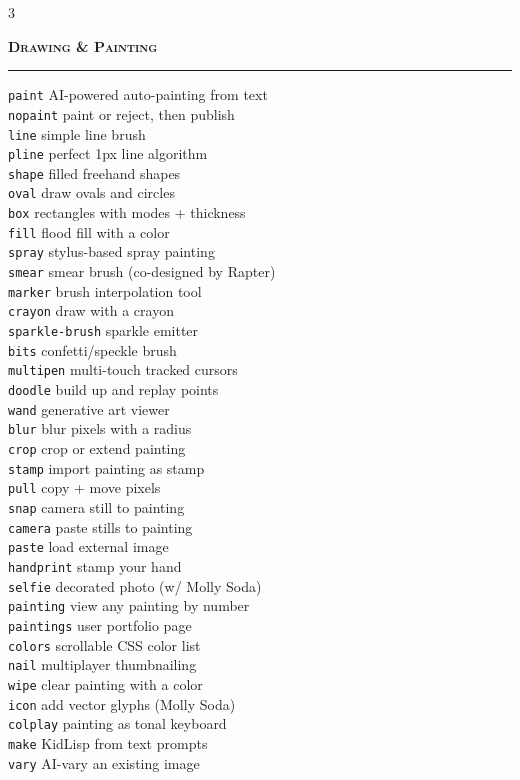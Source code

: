 \documentclass[10pt,letterpaper,twocolumn]{article}
\newcommand{\pe}[2]{\texttt{\color{acpurple}#1} #2}
\newcommand{\peh}[1]{\vspace{0.3em}\noindent\textbf{\textsc{#1}}\par\vspace{0.1em}\hrule\vspace{0.2em}}
\begin{document}
\vspace{0.3em}

\begin{multicols}{3}
\scriptsize

\peh{Drawing \& Painting}
\pe{paint}{AI-powered auto-painting from text}\\
\pe{nopaint}{paint or reject, then publish}\\
\pe{line}{simple line brush}\\
\pe{pline}{perfect 1px line algorithm}\\
\pe{shape}{filled freehand shapes}\\
\pe{oval}{draw ovals and circles}\\
\pe{box}{rectangles with modes + thickness}\\
\pe{fill}{flood fill with a color}\\
\pe{spray}{stylus-based spray painting}\\
\pe{smear}{smear brush (co-designed by Rapter)}\\
\pe{marker}{brush interpolation tool}\\
\pe{crayon}{draw with a crayon}\\
\pe{sparkle-brush}{sparkle emitter}\\
\pe{bits}{confetti/speckle brush}\\
\pe{multipen}{multi-touch tracked cursors}\\
\pe{doodle}{build up and replay points}\\
\pe{wand}{generative art viewer}\\
\pe{blur}{blur pixels with a radius}\\
\pe{crop}{crop or extend painting}\\
\pe{stamp}{import painting as stamp}\\
\pe{pull}{copy + move pixels}\\
\pe{snap}{camera still to painting}\\
\pe{camera}{paste stills to painting}\\
\pe{paste}{load external image}\\
\pe{handprint}{stamp your hand}\\
\pe{selfie}{decorated photo (w/ Molly Soda)}\\
\pe{painting}{view any painting by number}\\
\pe{paintings}{user portfolio page}\\
\pe{colors}{scrollable CSS color list}\\
\pe{nail}{multiplayer thumbnailing}\\
\pe{wipe}{clear painting with a color}\\
\pe{icon}{add vector glyphs (Molly Soda)}\\
\pe{colplay}{painting as tonal keyboard}\\
\pe{make}{KidLisp from text prompts}\\
\pe{vary}{AI-vary an existing image}


\end{multicols}
\end{document}
